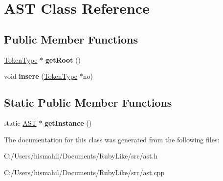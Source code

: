 \hypertarget{class_a_s_t}{\section{A\-S\-T Class Reference}
\label{class_a_s_t}
}
\subsection*{Public Member Functions}
\begin{DoxyCompactItemize}
\item 
\hypertarget{class_a_s_t_a8b2fadf5826a6894a115d5d85ee316e0}{\hyperlink{class_token_type}{Token\-Type} $\ast$ {\bfseries get\-Root} ()}\label{class_a_s_t_a8b2fadf5826a6894a115d5d85ee316e0}

\item 
\hypertarget{class_a_s_t_a979ed1f97578c9af99fa84fe5dedb365}{void {\bfseries insere} (\hyperlink{class_token_type}{Token\-Type} $\ast$no)}\label{class_a_s_t_a979ed1f97578c9af99fa84fe5dedb365}

\end{DoxyCompactItemize}
\subsection*{Static Public Member Functions}
\begin{DoxyCompactItemize}
\item 
\hypertarget{class_a_s_t_a8a0883c415729b54d7df170ff69e83d0}{static \hyperlink{class_a_s_t}{A\-S\-T} $\ast$ {\bfseries get\-Instance} ()}\label{class_a_s_t_a8a0883c415729b54d7df170ff69e83d0}

\end{DoxyCompactItemize}


The documentation for this class was generated from the following files\-:\begin{DoxyCompactItemize}
\item 
C\-:/\-Users/hismahil/\-Documents/\-Ruby\-Like/src/ast.\-h\item 
C\-:/\-Users/hismahil/\-Documents/\-Ruby\-Like/src/ast.\-cpp\end{DoxyCompactItemize}

